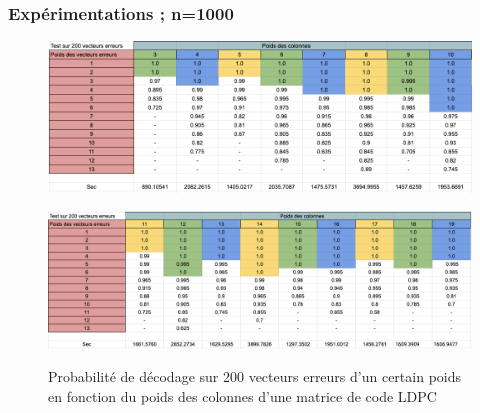 \documentclass{beamer}
\begin{document}
    \begin{frame}
        \frametitle{Expérimentations ; n=1000}
        \begin{figure}[h!]
            \centering
            \includegraphics[scale=0.5]{res1000_opti1.png}
            \label{fig:res3}
        \end{figure}
        \begin{figure}[h!]
            \centering
            \includegraphics[scale=0.5]{res1000_opti2.png}
            \label{fig:res4}
            \caption{Probabilité de décodage sur 200 vecteurs erreurs d'un certain poids en fonction du poids des colonnes d'une matrice de code LDPC}
        \end{figure}
    \end{frame}
\end{document}
